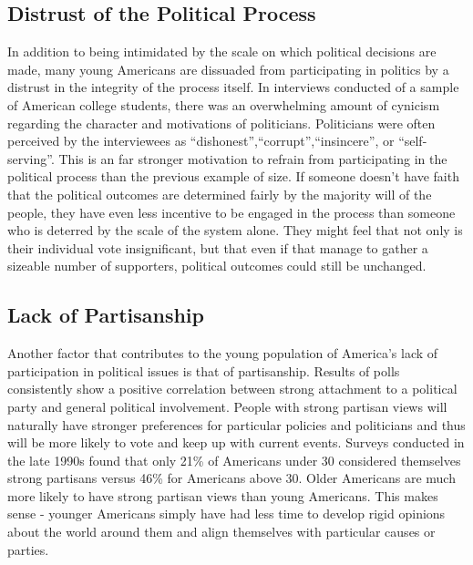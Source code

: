 \documentclass[12pt,letterpaper]{article}
\begin{document}
\subsection{Distrust of the Political Process} In addition to being
intimidated by the scale on which political decisions are made, many
young Americans are dissuaded from participating in politics by a
distrust in the integrity of the process itself. In interviews
conducted of a sample of American college students, there was an
overwhelming amount of cynicism regarding the character and
motivations of politicians.  Politicians were often perceived by the
interviewees as ``dishonest'',``corrupt'',``insincere'', or
``self-serving''.  This is an far stronger motivation to refrain from
participating in the political process than the previous example of
size. If someone doesn't have faith that the political outcomes are
determined fairly by the majority will of the people, they have even
less incentive to be engaged in the process than someone who is
deterred by the scale of the system alone.  They might feel that not
only is their individual vote insignificant, but that even if that
manage to gather a sizeable number of supporters, political outcomes
could still be unchanged.

\subsection{Lack of Partisanship} Another factor that contributes to
the young population of America's lack of participation in political
issues is that of partisanship.  Results of polls consistently show a
positive correlation between strong attachment to a political party
and general political involvement.  People with strong partisan views
will naturally have stronger preferences for particular policies and
politicians and thus will be more likely to vote and keep up with
current events. Surveys conducted in the late 1990s found that only
21\% of Americans under 30 considered themselves strong partisans
versus 46\% for Americans above 30. Older Americans are much more
likely to have strong partisan views than young Americans.  This makes
sense - younger Americans simply have had less time to develop rigid
opinions about the world around them and align themselves with
particular causes or parties.  

\subsection{}



\end{document}
